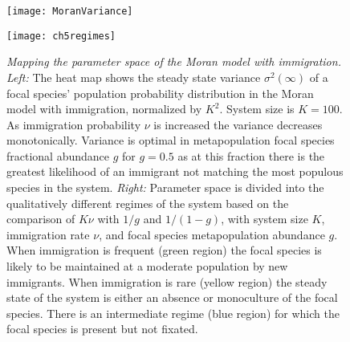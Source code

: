 \begin{figure}[h]
	\centering
	\begin{minipage}{0.49\linewidth}
		\centering
		\texttt{[image: MoranVariance]}
	\end{minipage}
	\begin{minipage}{0.49\linewidth}
		\centering
		\texttt{[image: ch5regimes]}
	\end{minipage}
	\caption{\emph{Mapping the parameter space of the Moran model with immigration.}
		\emph{Left:} The heat map shows the steady state variance $\sigma^2(\infty)$ of a focal species' population probability distribution in the Moran model with immigration, normalized by $K^2$. System size is $K=100$. As immigration probability $\nu$ is increased the variance decreases monotonically. Variance is optimal in metapopulation focal species fractional abundance $g$ for $g=0.5$ as at this fraction there is the greatest likelihood of an immigrant not matching the most populous species in the system. 
		\emph{Right:} Parameter space is divided into the qualitatively different regimes of the system based on the comparison of $K\nu$ with $1/g$ and $1/(1-g)$, with system size $K$, immigration rate $\nu$, and focal species metapopulation abundance $g$. When immigration is frequent (green region) the focal species is likely to be maintained at a moderate population by new immigrants. When immigration is rare (yellow region) the steady state of the system is either an absence or monoculture of the focal species. There is an intermediate regime (blue region) for which the focal species is present but not fixated. 
	} \label{biodiversity-regimes}
\end{figure}%

